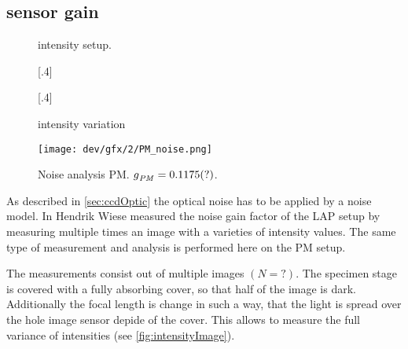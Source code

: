 \subsection{sensor gain}
%
\begin{figure}[!t]
\centering
\def\tikzwidth{0.75\textwidth}
\caption[intensity setup]{intensity setup. }
\label{fig:intensityFocus}
\end{figure}
% 
\begin{figure}[!t]
\centering
% 
[.4\textwidth]{
% 
}
% 
[.4\textwidth]{
}
% 
\caption[intensity image]{intensity variation}
\label{fig:intensityMeasurement}
\end{figure}
% 
% 
\begin{figure}[!t]
\centering
\texttt{[image: dev/gfx/2/PM\_noise.png]}
\caption[Noise analysis]{Noise analysis PM. $\textnormal{$g$}_{\mathit{PM}} = \SI{0.1175}{}(?)$. }
\label{fig:parameterModelSimGain}
\end{figure}
% 
As described in \cref{sec:ccdOptic} the optical noise has to be applied by a noise model.
In \cite{Wiese:887678} Hendrik Wiese measured the noise gain factor of the \ac{LAP} setup by measuring multiple times an image with a varieties of intensity values.
The same type of measurement and analysis is performed here on the \ac{PM} setup.

The measurements consist out of multiple images $(N=?)$. The specimen stage is covered with a fully absorbing cover, so that half of the image is dark.
Additionally the focal length is change in such a way, that the light is spread over the hole image sensor depide of the cover.
This allows to measure the full variance of intensities (see \cref{fig:intensityImage}).

